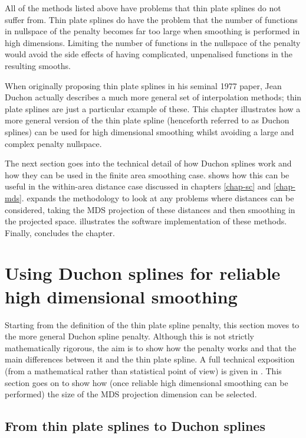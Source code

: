 All of the methods listed above have problems that thin plate splines do not suffer from. Thin plate splines do have the problem that the number of functions in nullspace of the penalty becomes far too large when smoothing is performed in high dimensions. Limiting the number of functions in the nullspace of the penalty would avoid the side effects of having complicated, unpenalised functions in the resulting smooths. 

When originally proposing thin plate splines in his seminal 1977 paper, Jean Duchon actually describes a much more general set of interpolation methods; thin plate splines are just a particular example of these. This chapter illustrates how a more general version of the thin plate spline (henceforth referred to as Duchon splines) can be used for high dimensional smoothing whilst avoiding a large and complex penalty nullspace.

The next section goes into the technical detail of how Duchon splines work and how they can be used in the finite area smoothing case.  shows how this can be useful in the within-area distance case discussed in chapters \ref{chap-sc} and \ref{chap-mds}.  expands the methodology to look at any problems where distances can be considered, taking the MDS projection of these distances and then smoothing in the projected space.  illustrates the software implementation of these methods. Finally,  concludes the chapter.

\section{Using Duchon splines for reliable high dimensional smoothing}

Starting from the definition of the thin plate spline penalty, this section moves to the more general Duchon spline penalty. Although this is not strictly mathematically rigorous, the aim is to show how the penalty works and that the main differences between it and the thin plate spline. A full technical exposition (from a mathematical rather than statistical point of view) is given in . This section goes on to show how (once reliable high dimensional smoothing can be performed) the size of the MDS projection dimension can be selected.


\subsection{From thin plate splines to Duchon splines}
\label{gds-tprstoduchon}

